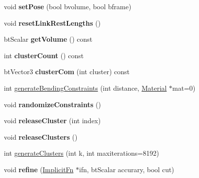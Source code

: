 \begin{DoxyCompactItemize}
\item 
\hypertarget{classbt_soft_body_a13672a0c23f4b2af774ed83a6457cbef}{void {\bfseries set\+Pose} (bool bvolume, bool bframe)}\label{classbt_soft_body_a13672a0c23f4b2af774ed83a6457cbef}

\item 
\hypertarget{classbt_soft_body_afaf8cbc96cb174bb9b9937c5eb42c921}{void {\bfseries reset\+Link\+Rest\+Lengths} ()}\label{classbt_soft_body_afaf8cbc96cb174bb9b9937c5eb42c921}

\item 
\hypertarget{classbt_soft_body_acfa376b0906401dc0f33d6ac9b7e0164}{bt\+Scalar {\bfseries get\+Volume} () const }\label{classbt_soft_body_acfa376b0906401dc0f33d6ac9b7e0164}

\item 
\hypertarget{classbt_soft_body_a5172e7b77934f37e37cdcb41f37c5a0b}{int {\bfseries cluster\+Count} () const }\label{classbt_soft_body_a5172e7b77934f37e37cdcb41f37c5a0b}

\item 
\hypertarget{classbt_soft_body_a9f3cd0e04c9c7eb5692720da29e88a4f}{bt\+Vector3 {\bfseries cluster\+Com} (int cluster) const }\label{classbt_soft_body_a9f3cd0e04c9c7eb5692720da29e88a4f}

\item 
int \hyperlink{classbt_soft_body_af31b03f0ff5eecec1ec9eee5a7582d20}{generate\+Bending\+Constraints} (int distance, \hyperlink{structbt_soft_body_1_1_material}{Material} $\ast$mat=0)
\item 
\hypertarget{classbt_soft_body_acc984ed7b1ae0c8520d474f4ba3e053f}{void {\bfseries randomize\+Constraints} ()}\label{classbt_soft_body_acc984ed7b1ae0c8520d474f4ba3e053f}

\item 
\hypertarget{classbt_soft_body_a916cd79e87cf151686267100cb83031c}{void {\bfseries release\+Cluster} (int index)}\label{classbt_soft_body_a916cd79e87cf151686267100cb83031c}

\item 
\hypertarget{classbt_soft_body_a9acc6f49f29e890115e42c4deec24f85}{void {\bfseries release\+Clusters} ()}\label{classbt_soft_body_a9acc6f49f29e890115e42c4deec24f85}

\item 
int \hyperlink{classbt_soft_body_a9915ca0d99dbeb9f39221dab218d5208}{generate\+Clusters} (int k, int maxiterations=8192)
\item 
\hypertarget{classbt_soft_body_a9d29ac0eb82c40645c17b5082a7325c9}{void {\bfseries refine} (\hyperlink{structbt_soft_body_1_1_implicit_fn}{Implicit\+Fn} $\ast$ifn, bt\+Scalar accurary, bool cut)}\label{classbt_soft_body_a9d29ac0eb82c40645c17b5082a7325c9}


\end{DoxyCompactItemize}
